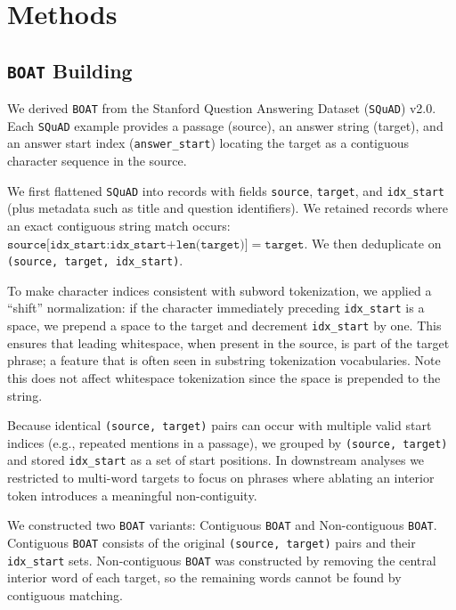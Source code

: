 \documentclass[10pt,twocolumn]{article}
\theoremstyle{plain}
\theoremstyle{definition}
\theoremstyle{remark}
\begin{document}
\clearpage
\newpage
\onecolumn
\appendix

\section{Methods}
\subsection{\texttt{BOAT} Building}
We derived \texttt{BOAT} from the Stanford Question Answering Dataset (\texttt{SQuAD}) v2.0. Each \texttt{SQuAD} example provides a passage (source), an answer string (target), and an answer start index (\texttt{answer\_start}) locating the target as a contiguous character sequence in the source.

We first flattened \texttt{SQuAD} into records with fields \texttt{source}, \texttt{target}, and \texttt{idx\_start} (plus metadata such as title and question identifiers). We retained records where an exact contiguous string match occurs:  $\texttt{source[idx\_start:idx\_start+len(target)]} = \texttt{target}.$ We then deduplicate on \texttt{(source, target, idx\_start)}.

To make character indices consistent with subword tokenization, we applied a ``shift'' normalization: if the character immediately preceding \texttt{idx\_start} is a space, we prepend a space to the target and decrement \texttt{idx\_start} by one. This ensures that leading whitespace, when present in the source, is part of the target phrase; a feature that is often seen in substring tokenization vocabularies. Note this does not affect whitespace tokenization since the space is prepended to the string.

Because identical \texttt{(source, target)} pairs can occur with multiple valid start indices (e.g., repeated mentions in a passage), we grouped by \texttt{(source, target)} and stored \texttt{idx\_start} as a set of start positions. In downstream analyses we restricted to multi-word targets to focus on phrases where ablating an interior token introduces a meaningful non-contiguity.

We constructed two \texttt{BOAT} variants: Contiguous \texttt{BOAT} and Non-contiguous \texttt{BOAT}. Contiguous \texttt{BOAT} consists of the original \texttt{(source, target)} pairs and their \texttt{idx\_start} sets. Non-contiguous \texttt{BOAT} was constructed by removing the central interior word of each target, so the remaining words cannot be found by contiguous matching.
\end{document}

